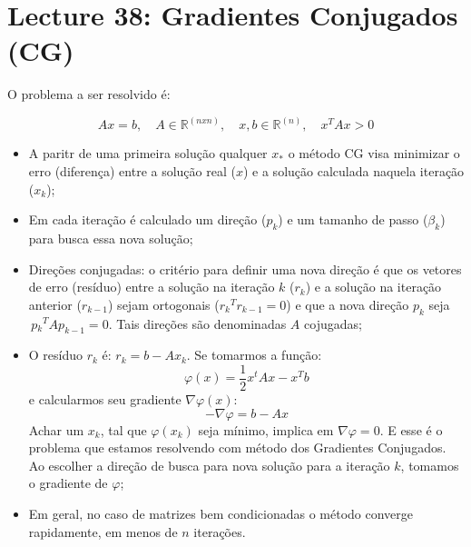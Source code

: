 \documentclass[a4paper,11pt]{article}
\begin{document}
\section*{Lecture 38: Gradientes Conjugados (CG)}

O problema a ser resolvido é:

$$Ax = b, \quad A \in \mathbb{R}^{(nxn)}, \quad x, b \in  \mathbb{R}^{(n)}, \quad x^TAx > 0  $$

\begin{itemize}
\item A paritr de uma primeira solução qualquer $x_{*}$ o método CG visa minimizar o erro (diferença) entre a solução real ($x$) e a solução calculada naquela iteração ($x_k$);

\item Em cada iteração é calculado um direção ($p_k$) e um tamanho de passo ($\beta_k$) para busca essa nova solução;

\item Direções conjugadas: o critério para definir uma nova direção é que os vetores de erro (resíduo) entre a solução na iteração $k$ ($r_k$) e a solução na iteração anterior ($r_{k-1}$) sejam ortogonais ($r{_k}^{T}r_{k-1} = 0$) e que a nova direção $p_k$ seja $\,p{_k}^{T}Ap_{k-1} = 0$. Tais direções são denominadas $A$ cojugadas;

\item O resíduo $r_k$ é: $r_k = b - Ax_k$. Se tomarmos a função: $$\varphi(x) = \frac{1}{2} x^tAx - x^Tb$$ e calcularmos seu gradiente $\nabla\varphi(x)$: $$ - \nabla\varphi = b - Ax$$
Achar um $x_k$, tal que $\varphi(x_k)$ seja mínimo, implica em $\nabla\varphi = 0$. E esse é o problema que estamos resolvendo com método dos Gradientes Conjugados. Ao escolher a direção de busca para nova solução para a iteração $k$, tomamos o gradiente de $\varphi$;

\item Em geral, no caso de matrizes bem condicionadas o método converge rapidamente, em menos de $n$ iterações.
 
\end{itemize}

\end{document}
